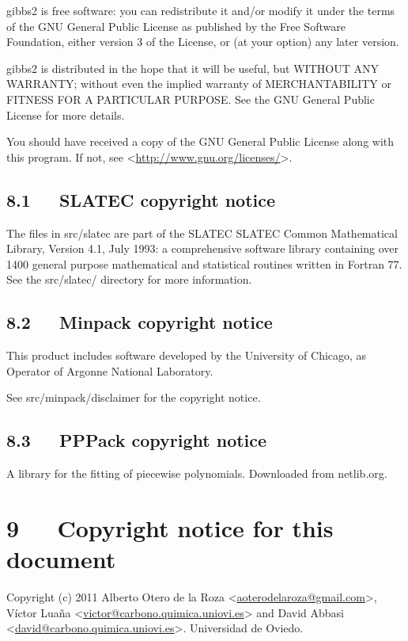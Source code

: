 \documentclass[a4paper]{article}
\begin{document}
gibbs2 is free software: you can redistribute it and/or modify
it under the terms of the GNU General Public License as published by
the Free Software Foundation, either version 3 of the License, or (at
your option) any later version.

gibbs2 is distributed in the hope that it will be useful,
but WITHOUT ANY WARRANTY; without even the implied warranty of
MERCHANTABILITY or FITNESS FOR A PARTICULAR PURPOSE.  See the
GNU General Public License for more details.

You should have received a copy of the GNU General Public License
along with this program.  If not, see <\url{http://www.gnu.org/licenses/}>.


\subsection{8.1~~~SLATEC copyright notice%
  \label{slatec-copyright-notice}%
}

The files in src/slatec are part of the SLATEC SLATEC Common
Mathematical Library, Version 4.1, July 1993:
a comprehensive software library containing over
1400 general purpose mathematical and statistical routines
written in Fortran 77. See the src/slatec/ directory for more
information.


\subsection{8.2~~~Minpack copyright notice%
  \label{minpack-copyright-notice}%
}

This product includes software developed by the
University of Chicago, as Operator of Argonne National
Laboratory.

See src/minpack/disclaimer for the copyright notice.


\subsection{8.3~~~PPPack copyright notice%
  \label{pppack-copyright-notice}%
}

A library for the fitting of piecewise polynomials. Downloaded from
netlib.org.


\section{9~~~Copyright notice for this document%
  \label{copyright-notice-for-this-document}%
}

Copyright (c) 2011 Alberto Otero de la Roza <\href{mailto:aoterodelaroza@gmail.com}{aoterodelaroza@gmail.com}>,
Víctor Luaña <\href{mailto:victor@carbono.quimica.uniovi.es}{victor@carbono.quimica.uniovi.es}> and David
Abbasi <\href{mailto:david@carbono.quimica.uniovi.es}{david@carbono.quimica.uniovi.es}>. Universidad de Oviedo.
\end{document}
